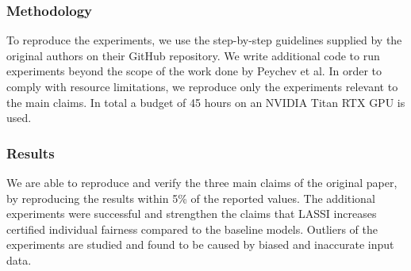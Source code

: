 \subsubsection*{Methodology}


To reproduce the experiments, we use the step-by-step guidelines supplied by the original authors on their GitHub repository. We write additional code to run experiments beyond the scope of the work done by Peychev et al. In order to comply with resource limitations, we reproduce only the experiments relevant to the main claims. In total a budget of 45 hours on an NVIDIA Titan RTX GPU is used.



\subsubsection*{Results}
We are able to reproduce and verify the three main claims of the original paper, by reproducing the results within 5\% of the reported values. The additional experiments were successful and strengthen the claims that LASSI increases certified individual fairness compared to the baseline models. Outliers of the experiments are studied and found to be caused by biased and inaccurate input data.


